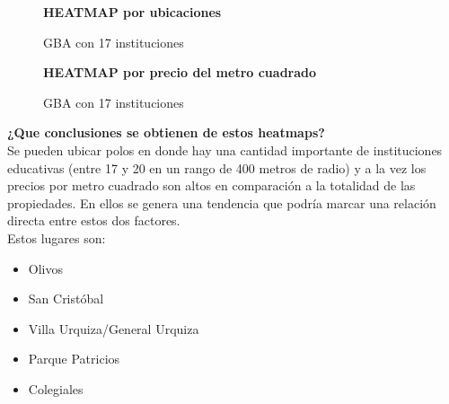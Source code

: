 \documentclass[a4paper, 10pt]{article}
\newcommand\tab[1][0.5cm]{\hspace*{#1}}
\begin{document}
				\begin{figure}[H]
    				\centering
    				\textbf{HEATMAP por ubicaciones}\par\medskip
    				\caption{GBA con 17 instituciones}
				\end{figure}
				\begin{figure}[H]
    				\centering
    				\textbf{HEATMAP por precio del metro cuadrado}\par\medskip
    				\caption{GBA con 17 instituciones}
				\end{figure}
				

				\textbf{¿Que conclusiones se obtienen de estos heatmaps?}\\	
					\tab Se pueden ubicar polos en donde hay una cantidad importante de instituciones educativas 
					(entre 17 y 20 en un rango de 400 metros de radio) y a la vez los precios por metro 
					cuadrado son altos en comparación a la totalidad de las propiedades. En ellos se 
					genera una tendencia que podría marcar una relación directa entre estos dos factores.\\ 
					Estos lugares son:
					\begin{itemize}
					\item Olivos
					\item San Cristóbal
					\item Villa Urquiza/General Urquiza
					\item Parque Patricios
					\item Colegiales
					\end{itemize}						
\end{document}

